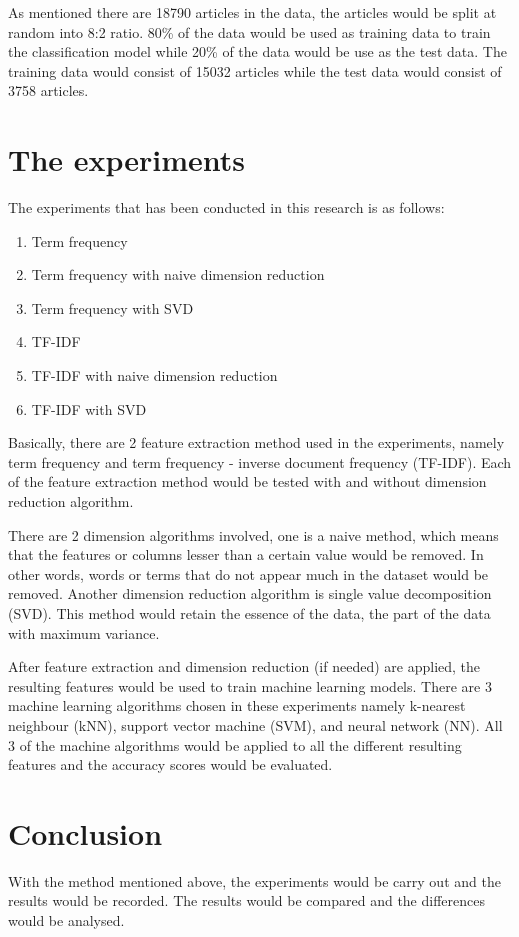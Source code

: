 As mentioned there are 18790 articles in the data, the articles would be split at random into 8:2 ratio. 80\% of the data would be used as training data to train the classification model while 20\% of the data would be use as the test data. The training data would consist of 15032 articles while the test data would consist of 3758 articles.\\


\clearpage
\section{The experiments}
The experiments that has been conducted in this research is as follows:
\begin{enumerate}
	\item Term frequency
	\item Term frequency with naive dimension reduction
	\item Term frequency with SVD
	\item TF-IDF
	\item TF-IDF with naive dimension reduction
	\item TF-IDF with SVD
\end{enumerate}

Basically, there are 2 feature extraction method used in the experiments, namely term frequency and term frequency - inverse document frequency (TF-IDF). Each of the feature extraction method would be tested with and without dimension reduction algorithm.

There are 2 dimension algorithms involved, one is a naive method, which means that the features or columns lesser than a certain value would be removed. In other words, words or terms that do not appear much in the dataset would be removed. Another dimension reduction algorithm is single value decomposition (SVD). This method would retain the essence of the data, the part of the data with maximum variance. 

After feature extraction and dimension reduction (if needed) are applied, the resulting features would be used to train machine learning models. There are 3 machine learning algorithms chosen in these experiments namely k-nearest neighbour (kNN), support vector machine (SVM), and neural network (NN). All 3 of the machine algorithms would be applied to all the different resulting features and the accuracy scores would be evaluated.


\section{Conclusion}
With the method mentioned above, the experiments would be carry out and the results would be recorded. The results would be compared and the differences would be analysed.